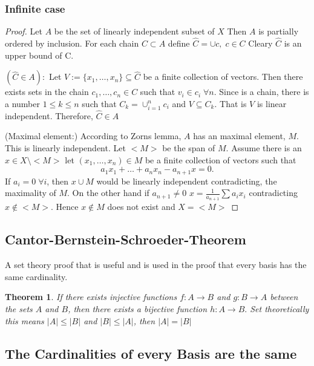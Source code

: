 \documentclass[titlepage]{article}
\newtheorem{thm}{Theorem}[section]
\begin{document}
\subsubsection{Infinite case}
\begin{proof}
Let $A$ be the set of linearly independent subset of $X$ Then $A$ is partially ordered by inclusion. For each chain $C \subset A$ define $\hat{C} = \cup  c ,\; c \in C$
Cleary $\hat{C}$ is an upper bound of C.

$(\hat{C}\in A):$ Let $V:= \{x_1,\ldots, x_n\} \subseteq \hat{C}$ be a finite collection of vectors. Then there exists sets in the chain $c_1,\ldots, c_n\in C$ such that $v_i \in c_i  \;\forall n$. Since is a chain, there is a number $1\leq k \leq n$ such that $C_k =\cup_{i = 1}^n c_i$ and $V\subseteq C_k$. That is $V$ is linear independent. Therefore, $\hat{C} \in A$

(Maximal element:) According to Zorns lemma, $A$ has an maximal element, $M$. This is linearly independent. Let $<M>$ be the span of $M$. Assume there is an $x\in X\setminus<M>$ let $(x_1,\ldots, x_n)\in M$ be a finite collection of vectors such that 
\begin{equation}
a_1x_1 + \ldots + a_nx_n - a_{n+1}x = 0.
\end{equation}
If $a_{i} = 0 \; \forall i$, then $x\cup M$ would be linearly independent contradicting, the maximality of $M$. On the other hand if $a_{n+1} \neq 0$  $x = \frac{1}{a_{n+1}} \sum a_ix_i$ contradicting $x\not\in <M>$. Hence $x\not \in M$ does not exist and $X = <M>$
\end{proof}
\subsection{Cantor-Bernstein-Schroeder-Theorem}
A set theory proof that is useful and is used in the proof that every basis has the same cardinality.

\begin{thm}
If there exists injective functions $f:A\rightarrow B$ and $g:B \rightarrow A$
between the sets $A$ and $B$, then there exists a bijective function $h: A \rightarrow B.$ Set theoretically this means $|A|\leq |B|$ and $|B| \leq |A|$, then $|A| = |B|$
\end{thm}
\subsection{The Cardinalities of every Basis are the same}
\end{document}
